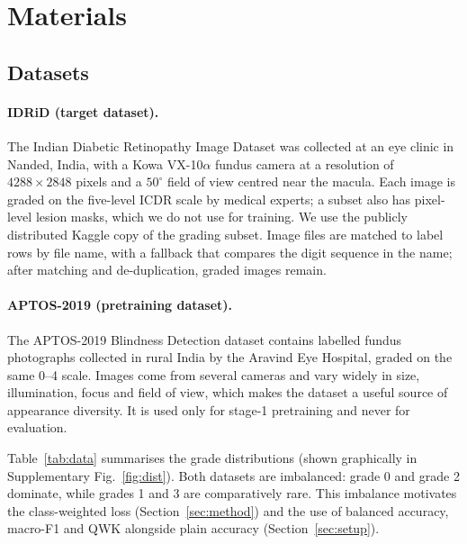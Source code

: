 \section{Materials}\label{sec:data}
\subsection{Datasets}
\paragraph{IDRiD (target dataset).}
The Indian Diabetic Retinopathy Image Dataset \citep{porwal2018idrid,porwal2020idrid} was collected at an eye clinic
in Nanded, India, with a Kowa VX-10$\alpha$ fundus camera at a resolution of $4288\times2848$ pixels and a
$50^\circ$ field of view centred near the macula. Each image is graded on the five-level ICDR scale
\citep{wilkinson2003proposed} by medical experts; a subset also has pixel-level lesion masks, which we do not use
for training. We use the publicly distributed Kaggle copy of the grading subset. Image files are matched to label
rows by file name, with a fallback that compares the digit sequence in the name; after matching and de-duplication,
 graded images remain.

\paragraph{APTOS-2019 (pretraining dataset).}
The APTOS-2019 Blindness Detection dataset \citep{aptos2019} contains  labelled fundus photographs
collected in rural India by the Aravind Eye Hospital, graded on the same 0--4 scale. Images come from several
cameras and vary widely in size, illumination, focus and field of view, which makes the dataset a useful source of
appearance diversity. It is used only for stage-1 pretraining and never for evaluation.

Table~\ref{tab:data} summarises the grade distributions (shown graphically in Supplementary Fig.~\ref{fig:dist}). Both datasets
are imbalanced: grade 0 and grade 2 dominate, while grades 1 and 3 are comparatively rare. This imbalance motivates
the class-weighted loss (Section~\ref{sec:method}) and the use of balanced accuracy, macro-F1 and QWK alongside plain
accuracy (Section~\ref{sec:setup}).

